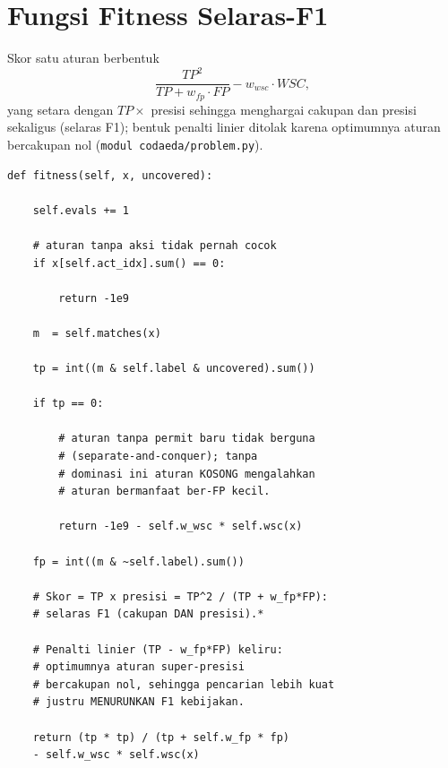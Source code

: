 \section{Fungsi Fitness Selaras-F1}

Skor satu aturan berbentuk
\[
\frac{TP^2}{TP + w_{fp}\cdot FP} - w_{wsc}\cdot WSC,
\]
yang setara dengan $TP \times$ presisi sehingga menghargai cakupan dan presisi sekaligus (selaras F1); bentuk penalti linier ditolak karena optimumnya aturan bercakupan nol (\texttt{modul codaeda/problem.py}).

\begin{verbatim}
def fitness(self, x, uncovered):

    self.evals += 1

    # aturan tanpa aksi tidak pernah cocok
    if x[self.act_idx].sum() == 0: 

        return -1e9

    m  = self.matches(x)

    tp = int((m & self.label & uncovered).sum())

    if tp == 0:

        # aturan tanpa permit baru tidak berguna
        # (separate-and-conquer); tanpa 
        # dominasi ini aturan KOSONG mengalahkan 
        # aturan bermanfaat ber-FP kecil.

        return -1e9 - self.w_wsc * self.wsc(x)

    fp = int((m & ~self.label).sum())

    # Skor = TP x presisi = TP^2 / (TP + w_fp*FP): 
    # selaras F1 (cakupan DAN presisi).*

    # Penalti linier (TP - w_fp*FP) keliru: 
    # optimumnya aturan super-presisi
    # bercakupan nol, sehingga pencarian lebih kuat 
    # justru MENURUNKAN F1 kebijakan.

    return (tp * tp) / (tp + self.w_fp * fp) 
    - self.w_wsc * self.wsc(x)
\end{verbatim}